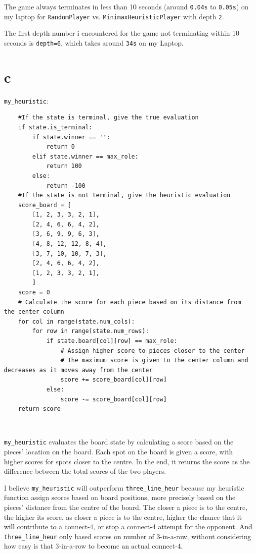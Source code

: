 \documentclass[12pt]{article}
\begin{document}
\begin{enumerate}
	The game always terminates in less than 10 seconds (around \texttt{0.04s} to \texttt{0.05s}) on my laptop for \texttt{RandomPlayer} vs. \texttt{MinimaxHeuristicPlayer} with depth \texttt{2}.
	
	The first depth number i encountered for the game not terminating within 10 seconds is \texttt{depth=6}, which takes around \texttt{34s} on my Laptop.

\part{c} 

	\texttt{my\_heuristic}:

	\begin{lstlisting}
	#If the state is terminal, give the true evaluation
    if state.is_terminal:
        if state.winner == '':
            return 0
        elif state.winner == max_role:
            return 100
        else:
            return -100
    #If the state is not terminal, give the heuristic evaluation
    score_board = [
        [1, 2, 3, 3, 2, 1],
        [2, 4, 6, 6, 4, 2],
        [3, 6, 9, 9, 6, 3],
        [4, 8, 12, 12, 8, 4],
        [3, 7, 10, 10, 7, 3],
        [2, 4, 6, 6, 4, 2],
        [1, 2, 3, 3, 2, 1],
        ]
    score = 0
    # Calculate the score for each piece based on its distance from the center column
    for col in range(state.num_cols):
        for row in range(state.num_rows):
            if state.board[col][row] == max_role:
                # Assign higher score to pieces closer to the center
                # The maximum score is given to the center column and decreases as it moves away from the center
                score += score_board[col][row]
            else:
                score -= score_board[col][row]
    return score
	\end{lstlisting}\
	
	\texttt{my\_heuristic} evaluates the board state by calculating a score based on the pieces' location on the board. Each spot on the board is given a score, with higher scores for spots closer to the centre. In the end, it returns the score as the difference between the total scores of the two players.
	
	I believe \texttt{my\_heuristic} will outperform \texttt{three\_line\_heur} because  my heuristic function assign scores based on board positions, more precisely based on the pieces' distance from the centre of the board. The closer a piece is to the centre, the higher its score, as closer a piece is to the centre, higher the chance that it will contribute to a connect-4, or stop a connect-4 attempt for the opponent. And \texttt{three\_line\_heur} only based scores on number of 3-in-a-row, without considering how easy is that 3-in-a-row to become an actual connect-4.  
		

\end{enumerate}
\end{document}
